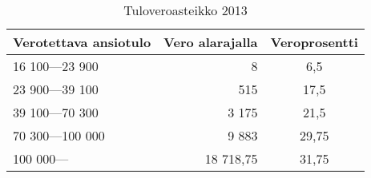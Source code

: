 \begin{table}[h]
    \centering
    \begin{tabular}{|lrc|}
    \hline
    Verotettava ansiotulo & Vero alarajalla & Veroprosentti \\
    \hline
    16 100—23 900                & 8                             & 6,5                                        \\
    23 900—39 100                & 515                           & 17,5                                       \\
    39 100—70 300                & 3 175                         & 21,5                                       \\
    70 300—100 000                & 9 883                      & 29,75                                      \\
    100 000—                      & 18 718,75                        & 31,75                                     \\
    \hline
    \end{tabular}
    \caption*{Tuloveroasteikko 2013}
\end{table}